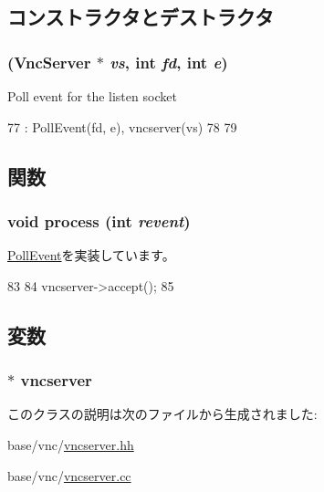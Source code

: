 \subsection{コンストラクタとデストラクタ}
\hypertarget{classVncServer_1_1ListenEvent_a58e725539783734ac669d71572f522aa}{
\subsubsection[{ListenEvent}]{ ({\bf VncServer} $\ast$ {\em vs}, \/  int {\em fd}, \/  int {\em e})}}
\label{classVncServer_1_1ListenEvent_a58e725539783734ac669d71572f522aa}
Poll event for the listen socket 


\begin{DoxyCode}
77     : PollEvent(fd, e), vncserver(vs)
78 {
79 }
\end{DoxyCode}


\subsection{関数}
\hypertarget{classVncServer_1_1ListenEvent_aedacbaeee0c89ceca526874c34f6b20b}{
\subsubsection[{process}]{\setlength{\rightskip}{0pt plus 5cm}void process (int {\em revent})}}
\label{classVncServer_1_1ListenEvent_aedacbaeee0c89ceca526874c34f6b20b}


\hyperlink{classPollEvent_a8b870dc0eeb339499d64aa56fc0e2aa5}{PollEvent}を実装しています。


\begin{DoxyCode}
83 {
84     vncserver->accept();
85 }
\end{DoxyCode}


\subsection{変数}
\hypertarget{classVncServer_1_1ListenEvent_ac122859a241350f501e4f77da81b669f}{
\subsubsection[{vncserver}]{$\ast$ {\bf vncserver}}}
\label{classVncServer_1_1ListenEvent_ac122859a241350f501e4f77da81b669f}


このクラスの説明は次のファイルから生成されました:\begin{DoxyCompactItemize}
\item 
base/vnc/\hyperlink{vncserver_8hh}{vncserver.hh}\item 
base/vnc/\hyperlink{vncserver_8cc}{vncserver.cc}\end{DoxyCompactItemize}
